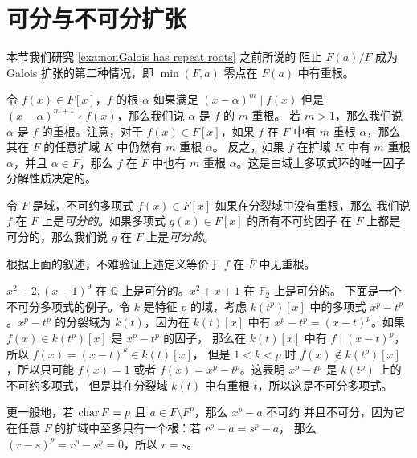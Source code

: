 \section{可分与不可分扩张}

本节我们研究 \autoref{exa:nonGalois has repeat roots} 之前所说的
阻止 $F(a)/F$ 成为 Galois 扩张的第二种情况，即
$\min(F,a)$ 零点在 $F(a)$ 中有重根。

令 $f(x)\in F[x]$，$f$ 的根 $\alpha$ 如果满足 $(x-\alpha)^m\mid f(x)$
但是 $(x-\alpha)^{m+1}\nmid f(x)$，那么我们说 $\alpha$ 是 $f$ 的 $m$ 重根。
若 $m >1$，那么我们说 $\alpha$ 是 $f$ 的重根。注意，对于 $f(x)\in F[x]$，如果
$f$ 在 $F$ 中有 $m$ 重根 $\alpha$，那么其在 $F$ 的任意扩域 $K$ 中仍然有 $m$ 重根 $\alpha$。
反之，如果 $f$ 在扩域 $K$ 中有 $m$ 重根 $\alpha$，并且 $\alpha\in F$，那么
$f$ 在 $F$ 中也有 $m$ 重根 $\alpha$。这是由域上多项式环的唯一因子分解性质决定的。

\begin{definition}
  令 $F$ 是域，不可约多项式 $f(x)\in F[x]$ 如果在分裂域中没有重根，那么
  我们说 $f$ 在 $F$ 上是\emph{可分的}。如果多项式 $g(x)\in F[x]$ 的所有不可约因子
  在 $F$ 上都是可分的，那么我们说 $g$ 在 $F$ 上是\emph{可分的}。
\end{definition}

根据上面的叙述，不难验证上述定义等价于 $f$ 在 $\bar F$ 中无重根。

\begin{example}\label{exa:separable or not polynomial}
  $x^2-2,(x-1)^9$ 在 $\mathbb{Q}$ 上是可分的。$x^2+x+1$ 在 $\mathbb{F}_2$ 上是可分的。
  下面是一个不可分多项式的例子。令 $k$ 是特征 $p$ 的域，考虑 $k(t^p)[x]$ 中的多项式
  $x^p-t^p$。$x^p-t^p$ 的分裂域为 $k(t)$，因为在 $k(t)[x]$ 中有
  $x^p-t^p=(x-t)^p$。如果 $f(x)\in k(t^p)[x]$ 是 $x^p-t^p$ 的因子，
  那么在 $k(t)[x]$ 中有 $f\mid (x-t)^p$，所以 $f(x)=(x-t)^k\in k(t)[x]$，
  但是 $1<k<p$ 时 $f(x)\notin k(t^p)[x]$，所以只可能 $f(x)=1$ 或者
  $f(x)=x^p-t^p$。这表明 $x^p-t^p$ 是 $k(t^p)$ 上的不可约多项式，
  但是其在分裂域 $k(t)$ 中有重根 $t$，所以这是不可分多项式。

  更一般地，若 $\operatorname{char}{F}=p$ 且 $a\in F\setminus F^p$，那么 $x^p-a$ 不可约
  并且不可分，因为它在任意 $F$ 的扩域中至多只有一个根：若 $r^p-a=s^p-a$，
  那么 $(r-s)^p=r^p-s^p=0$，所以 $r=s$。
\end{example}

